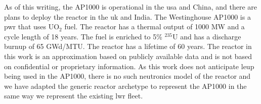 As of this writing, the AP1000 is operational in the \gls{usa} and China, and there are plans to deploy the reactor in the \gls{uk} and India. The Westinghouse AP1000 is a \gls{pwr} that uses UO$_2$ fuel. The reactor has a thermal output of 1000 MW and a cycle length of 18 years. The fuel is enriched to 5\% $^{235}$U and has a discharge burnup of 65 GWd/MTU. The reactor has a lifetime of 60 years. The reactor in this work is an approximation based on publicly available data and is not based on confidential or proprietary information. As this work does not anticipate \gls{leup} being used in the AP1000, there is no such neutronics model of the reactor and we have adapted the generic \cycamore reactor archetype to represent the AP1000 in the same way we represent the existing \gls{lwr} fleet.


